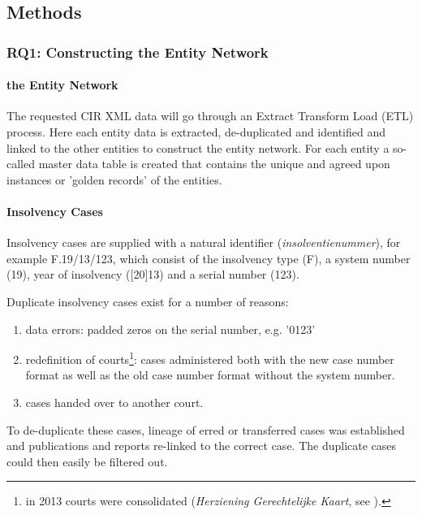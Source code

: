 \subsection{Methods}
\subsubsection{RQ1: Constructing the Entity Network}

\paragraph{the Entity Network}
The requested CIR XML data will go through an Extract Transform Load (ETL) process. Here each entity data is extracted, de-duplicated and identified and linked to the other entities to construct the entity network. For each entity a so-called master data table is created that contains the unique and agreed upon instances or 'golden records' of the entities. 

\paragraph{Insolvency Cases}
Insolvency cases are supplied with a natural identifier (\textit{insolventienummer}), for example F.19/13/123, which consist of the insolvency type (F), a system number (19), year of insolvency ([20]13) and a serial number (123). 

Duplicate insolvency cases exist for a number of reasons:
\begin{enumerate}
	\item data errors: padded zeros on the serial number, e.g. '0123'
	\item redefinition of courts\footnote{in 2013 courts were consolidated (\textit{Herziening Gerechtelijke Kaart}, see \cite{om:1}).}: cases administered both with the new case number format as well as the old case number format without the system number.
	\item cases handed over to another court.
\end{enumerate}
To de-duplicate these cases, lineage of erred or transferred cases was established and publications and reports re-linked to the correct case. The duplicate cases could then easily be filtered out.

